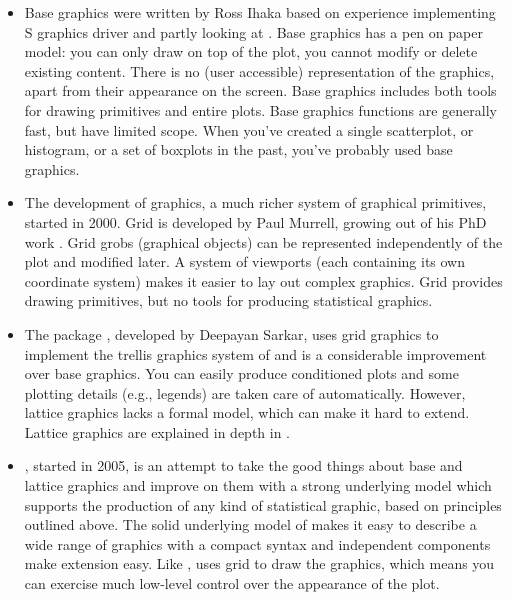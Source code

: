 \begin{itemize} 
  \item Base graphics were written by Ross Ihaka based on experience implementing S graphics driver and partly looking at \cite{chambers:1983}.  Base graphics has a pen on paper model: you can only draw on top of the plot, you cannot modify or delete existing content.  There is no (user accessible) representation of the graphics, apart from their appearance on the screen. Base graphics includes both tools for drawing primitives and entire plots.  Base graphics functions are generally fast, but have limited scope. When you've created a single scatterplot, or histogram, or a set of boxplots in the past, you've probably used base graphics. 

  \item The development of  graphics, a much richer system of graphical primitives, started in 2000.  Grid is developed by Paul Murrell, growing out of his PhD work \citep{murrell:1998}. Grid grobs (graphical objects) can be represented independently of the plot and modified later. A system of viewports (each containing its own coordinate system) makes it easier to lay out complex graphics. Grid provides drawing primitives, but no tools for producing statistical graphics. 

  \item The  package \citep{lattice}, developed by Deepayan Sarkar, uses grid graphics to implement the trellis graphics system of \citet{cleveland:1993,cleveland:1994} and is a considerable improvement over base graphics.  You can easily produce conditioned plots and some plotting details (e.g., legends) are taken care of automatically.  However, lattice graphics lacks a formal model, which can make it hard to extend.  Lattice graphics are explained in depth in \citep{sarkar:2008}. 

  \item \ggplot, started in 2005, is an attempt to take the good things about base and lattice graphics and improve on them with a strong underlying model which supports the production of any kind of statistical graphic, based on principles outlined above.  The solid underlying model of \ggplot makes it easy to describe a wide range of graphics with a compact syntax and independent components make extension easy.  Like , \ggplot uses grid to draw the graphics, which means you can exercise much low-level control over the appearance of the plot.

\end{itemize}

